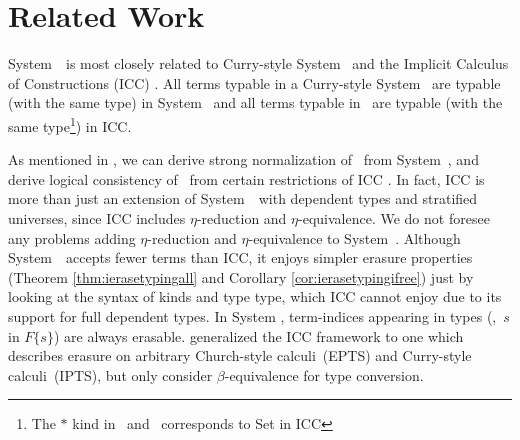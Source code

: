 \section{Related Work} \label{sec:relwork}
System~\Fi\ is most closely related to
Curry-style System~\Fw \cite{AbeMatUus05,GHR93}
and the Implicit Calculus of Constructions (ICC) \cite{Miquel01}.
All terms typable in a Curry-style System \Fw\ are typable (with the same type) in System \Fi\ 
and all terms typable in \Fi\ are typable (with the same type\footnote{The $*$ kind in \Fw\ and \Fi\ corresponds
	to \textsf{Set} in ICC}) in ICC.

As mentioned in \label{ssec:sn}, we can derive strong normalization of \Fi\ 
from System~\Fw, and derive logical consistency of \Fi\ from certain
restrictions of ICC \cite{Miquel00,BarrasB08}.
In fact, ICC is more than just an extension of System~\Fi\ 
with dependent types and stratified universes, since ICC includes
$\eta$-reduction and $\eta$-equivalence.
We do not foresee any problems adding
$\eta$-reduction and $\eta$-equivalence to System~\Fi.
Although System~\Fi\ accepts fewer terms than ICC, it enjoys simpler
erasure properties (Theorem \ref{thm:ierasetypingall} and
Corollary \ref{cor:ierasetypingifree}) just by looking at the syntax
of kinds and type type, which ICC cannot enjoy due to its support for
full dependent types.  In System \Fi, term-indices appearing in types
(\eg,~$s$ in $F\{s\}$) are always erasable.  \citet{LingerS08} generalized the ICC framework to one which describes
erasure on arbitrary Church-style calculi~(EPTS) and Curry-style
calculi~(IPTS), but only consider $\beta$-equivalence for type conversion.


